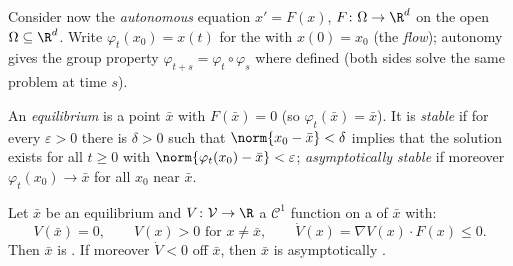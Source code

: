 Consider now the \emph{autonomous} equation $x' = F(x)$, $F
\colon \Omega \to \R^d$  on the open $\Omega
\subseteq \R^d$. Write $\varphi_t(x_0) = x(t)$ for the
 with $x(0) = x_0$ (the
\emph{flow}); autonomy gives
the group property $\varphi_{t+s} =
\varphi_t\circ\varphi_s$ where defined (both sides solve the
same problem at time $s$).

\begin{definition}\label{def:b3:ode:stability}
An \emph{equilibrium} is a point $\bar x$ with $F(\bar x) =
0$ (so $\varphi_t(\bar x) = \bar x$). It is
\emph{stable} if for every
$\varepsilon > 0$ there is $\delta > 0$ such that
$\norm{x_0 - \bar x} < \delta$ implies that the solution
exists for all $t \geq 0$ with $\norm{\varphi_t(x_0) - \bar
x} < \varepsilon$; \emph{asymptotically stable} if moreover
$\varphi_t(x_0) \to \bar x$ for all $x_0$ near $\bar x$.
\end{definition}

\begin{theorem}\label{thm:b3:ode:lyapunov}
Let $\bar x$ be an equilibrium and $V \colon \mathcal V \to
\R$ a $\mathcal C^1$ function on a  of $\bar x$
with:
\[
V(\bar x) = 0,\qquad V(x) > 0 \text{ for } x \neq \bar x,
\qquad \dot V(x) = \nabla V(x)\cdot F(x) \leq 0 .
\]
Then $\bar x$ is . If moreover $\dot V < 0 $ off $\bar
x$, then $\bar x$ is asymptotically .
\end{theorem}

